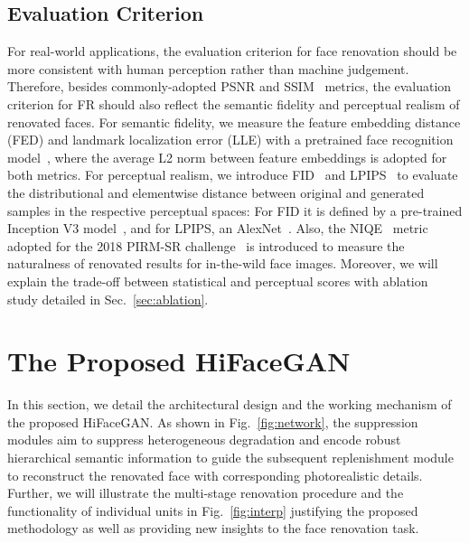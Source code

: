 \documentclass[sigconf]{acmart}
\begin{document}
\subsection{Evaluation Criterion}\label{sec:eval}
For real-world applications, the evaluation criterion for face renovation should be more consistent with human perception rather than machine judgement. Therefore, besides commonly-adopted PSNR and SSIM~\cite{SSIM}\cite{MultiscaleSSIM} metrics, the evaluation criterion for FR should also reflect the semantic fidelity and perceptual realism of renovated faces. For semantic fidelity, we measure the feature embedding distance (FED) and landmark localization error (LLE) with a pretrained face recognition model~\cite{dlib_paper}, where the average L2 norm between feature embeddings is adopted for both metrics. For perceptual realism, we introduce FID~\cite{FID} and LPIPS~\cite{LPIPS} to evaluate the distributional and elementwise distance between original and generated samples in the respective perceptual spaces: For FID it is defined by a pre-trained Inception V3 model~\cite{inceptionv3}, and for LPIPS, an AlexNet~\cite{AlexNet}. Also, the NIQE~\cite{niqe} metric adopted for the 2018 PIRM-SR challenge~\cite{esrgan} is introduced to measure the naturalness of renovated results for in-the-wild face images. Moreover, we will explain the trade-off between statistical and perceptual scores with ablation study detailed in Sec.~\ref{sec:ablation}.

\section{The Proposed HiFaceGAN}

In this section, we detail the architectural design and the working mechanism of the proposed HiFaceGAN. As shown in Fig.~\ref{fig:network}, the suppression modules aim to suppress heterogeneous degradation and encode robust hierarchical semantic information to guide the subsequent replenishment module to reconstruct the renovated face with corresponding photorealistic details. Further, we will illustrate the multi-stage renovation procedure and the functionality of individual units in Fig.~\ref{fig:interp} justifying the proposed methodology as well as providing new insights to the face renovation task.
\end{document}
